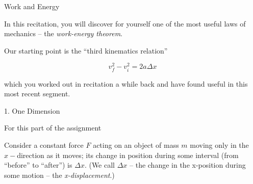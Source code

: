 \documentclass[12pt]{article}
\begin{document}
\Large
\centerline{}

\normalsize
\centerline{}

Work and Energy

In this recitation, you will discover for yourself one of the most useful laws of mechanics -- the {\it work-energy theorem}.

Our starting point is the ``third kinematics relation''

$$ v_f^2 - v_i^2 = 2 a \Delta x$$

which you worked out in recitation a while back and have found useful in this most recent segment. 



1. One Dimension

For this part of the assignment

Consider a constant force $F$ acting on an object of mass $m$ moving only in the $x-$direction as it moves; its change in position during some interval (from ``before'' to ``after'') is $\Delta x$. (We call $\Delta x$ -- the change in the x-position during some 
motion -- the {\it x-displacement}.)
\end{document}
